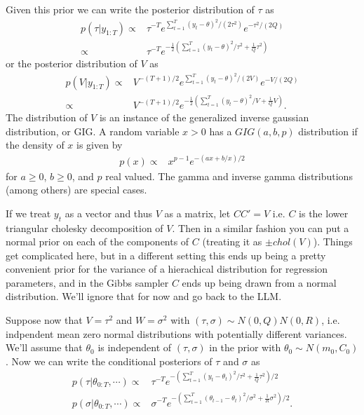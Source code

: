 \documentclass{article}
\begin{document}
Given this prior we can write the posterior distribution of $\tau$ as
\begin{align*}
  p(\tau|y_{1:T}) \propto & \tau^{-T}e^{\sum_{t=1}^T(y_t - \theta)^2/(2\tau^2)}e^{-\tau^2/(2Q)}\\
  \propto & \tau^{-T}e^{-\frac{1}{2}\left(\sum_{t=1}^T(y_t-\theta)^2/\tau^2 + \frac{1}{Q}\tau^2\right)}
\end{align*}
or the posterior distribution of $V$ as
\begin{align*}
  p(V|y_{1:T}) \propto & V^{-(T+1)/2}e^{\sum_{t=1}^T(y_t - \theta)^2/(2V)}e^{-V/(2Q)}\\
  \propto & V^{-(T+1)/2}e^{-\frac{1}{2}\left(\sum_{t=1}^T(y_t-\theta)^2/V + \frac{1}{Q}V\right)}.
\end{align*}
The distribution of $V$ is an instance of the generalized inverse gaussian distribution, or GIG. A random variable $x>0$ has a $GIG(a,b,p)$ distribution if the density of $x$ is given by
\begin{align*}
  p(x) \propto & x^{p-1}e^{-(ax + b/x)/2}
\end{align*}
for $a\ge 0$, $b \ge 0$, and $p$ real valued. The gamma and inverse gamma distributions (among others) are special cases.

If we treat $y_t$ as a vector and thus $V$ as a matrix, let $CC'=V$ i.e. $C$ is the lower triangular cholesky decomposition of $V$. Then in a similar fashion you can put a normal prior on each of the components of $C$ (treating it as $\pm chol(V)$). Things get complicated here, but in a different setting this ends up being a pretty convenient prior for the variance of a hierachical distribution for regression parameters, and in the Gibbs sampler $C$ ends up being drawn from a normal distribution. We'll ignore that for now and go back to the LLM.

Suppose now that $V=\tau^2$ and $W=\sigma^2$ with $(\tau,\sigma)\sim N(0,Q)N(0,R)$, i.e. indpendent mean zero normal distributions with potentially different variances. We'll assume that $\theta_0$ is independent of $(\tau,\sigma)$ in the prior with $\theta_0\sim N(m_0,C_0)$. Now we can write the conditional posteriors of $\tau$ and $\sigma$ as
\begin{align*}
  p(\tau|\theta_{0:T},\cdots)\propto & \tau^{-T} e^{-\left(\sum_{t=1}^T(y_t-\theta_t)^2/\tau^2 + \frac{1}{Q}\tau^2\right)/2}\\
  p(\sigma|\theta_{0:T},\cdots)\propto & \sigma^{-T} e^{-\left(\sum_{t=1}^T(\theta_{t-1}-\theta_t)^2/\sigma^2 + \frac{1}{R}\sigma^2\right)/2}.
\end{align*}
\end{document}
